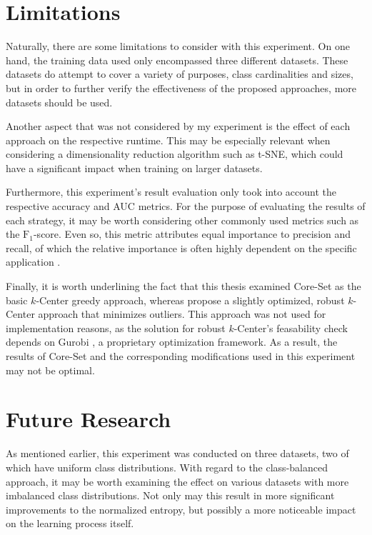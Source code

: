 \documentclass[english,bachelor,ul]{webisthesis} %
\begin{document}
\section{Limitations}

Naturally, there are some limitations to consider with this experiment. On one hand, the training data used only encompassed three different datasets. These datasets do attempt to cover a variety of purposes, class cardinalities and sizes, but in order to further verify the effectiveness of the proposed approaches, more datasets should be used. 

Another aspect that was not considered by my experiment is the effect of each approach on the respective runtime. This may be especially relevant when considering a dimensionality reduction algorithm such as t-SNE, which could have a significant impact when training on larger datasets. 

Furthermore, this experiment's result evaluation only took into account the respective accuracy and AUC metrics. For the purpose of evaluating the results of each strategy, it may be worth considering other commonly used metrics such as the $\text{F}_1$-score. Even so, this metric attributes equal importance to precision and recall, of which the relative importance is often highly dependent on the specific application \citep{DBLP:journals/sac/HandC18}.

Finally, it is worth underlining the fact that this thesis examined Core-Set as the basic $k$-Center greedy approach, whereas \cite{DBLP:conf/iclr/SenerS18} propose a slightly optimized, robust $k$-Center approach that minimizes outliers. This approach was not used for implementation reasons, as the solution for robust $k$-Center's feasability check depends on Gurobi \citep{gurobi}, a proprietary optimization framework. As a result, the results of Core-Set and the corresponding modifications used in this experiment may not be optimal.

\section{Future Research}

As mentioned earlier, this experiment was conducted on three datasets, two of which have uniform class distributions. With regard to the class-balanced approach, it may be worth examining the effect on various datasets with more imbalanced class distributions. Not only may this result in more significant improvements to the normalized entropy, but possibly a more noticeable impact on the learning process itself. 
\end{document}
